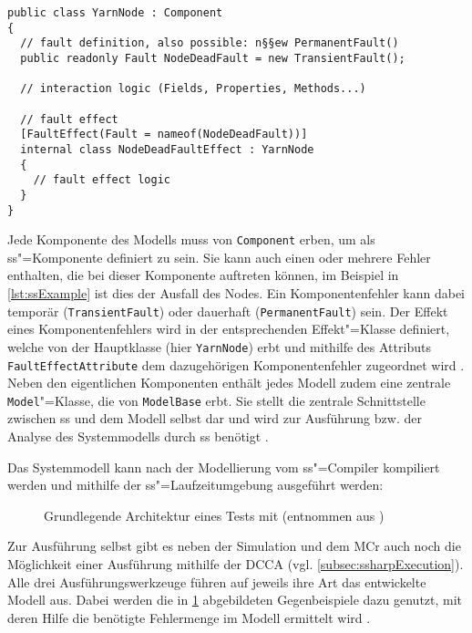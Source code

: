 \begin{lstlisting}[label=lst:ssExample,style=cs,
caption={Grundlegender Aufbau einer \glsentryshort{ss}"=Komponente.}]
public class YarnNode : Component
{
  // fault definition, also possible: n§§ew PermanentFault()
  public readonly Fault NodeDeadFault = new TransientFault();
  
  // interaction logic (Fields, Properties, Methods...)
  
  // fault effect
  [FaultEffect(Fault = nameof(NodeDeadFault))]
  internal class NodeDeadFaultEffect : YarnNode
  {
    // fault effect logic
  }
}
\end{lstlisting}

Jede Komponente des Modells muss von \texttt{Component} erben, um als \gls{ss}"=Komponente definiert zu sein.
Sie kann auch einen oder mehrere Fehler enthalten, die bei dieser Komponente auftreten können, im Beispiel in \cref{lst:ssExample} ist dies der Ausfall des Nodes.
Ein Komponentenfehler kann dabei temporär (\texttt{TransientFault}) oder dauerhaft (\texttt{PermanentFault}) sein.
Der Effekt eines Komponentenfehlers wird in der entsprechenden Effekt"=Klasse definiert, welche von der Hauptklasse (hier \texttt{YarnNode}) erbt und mithilfe des Attributs \texttt{FaultEffectAttribute} dem dazugehörigen Komponentenfehler zugeordnet wird \cite{Habermaier2016,Habermaier2015}.
Neben den eigentlichen Komponenten enthält jedes Modell zudem eine zentrale \texttt{Model}"=Klasse, die von \texttt{ModelBase} erbt.
Sie stellt die zentrale Schnittstelle zwischen \gls{ss} und dem Modell selbst dar und wird zur Ausführung bzw. der Analyse des Systemmodells durch \gls{ss} benötigt \cite{SSWikiModels}.

Das Systemmodell kann nach der Modellierung vom \gls{ss}"=Compiler kompiliert werden und mithilfe der \gls{ss}"=Laufzeitumgebung ausgeführt werden:

\begin{figure}[h]
    \caption[Grundlegende Architektur eines Tests mit ]
    {Grundlegende Architektur eines Tests mit  (entnommen aus \cite{Habermaier2016})}
    \label{fig:ssharpTestApproach}
\end{figure}

Zur Ausführung selbst gibt es neben der Simulation und dem \gls{MCr} auch noch die Möglichkeit einer Ausführung mithilfe der \gls{DCCA} (vgl. \cref{subsec:ssharpExecution}).
Alle drei Ausführungswerkzeuge führen auf jeweils ihre Art das entwickelte Modell aus.
Dabei werden die in \cref{fig:ssharpTestApproach} abgebildeten Gegenbeispiele dazu genutzt, mit deren Hilfe die benötigte Fehlermenge im Modell ermittelt wird \cite{Habermaier2016}.

